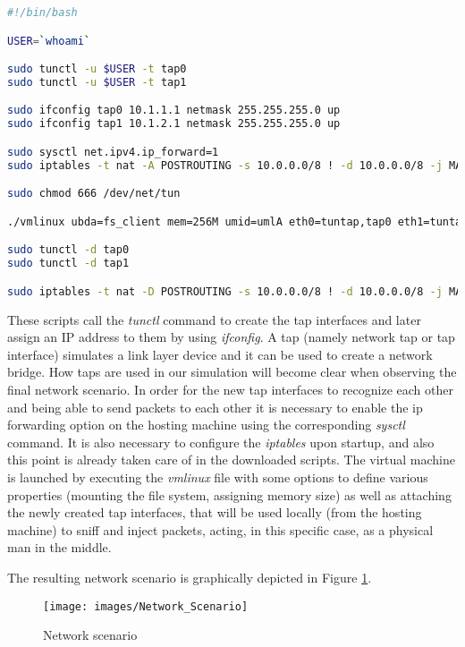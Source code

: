 \begin{lstlisting}[language=bash, caption=\textit{client.sh}, label=clientconf]
#!/bin/bash

USER=`whoami`

sudo tunctl -u $USER -t tap0
sudo tunctl -u $USER -t tap1

sudo ifconfig tap0 10.1.1.1 netmask 255.255.255.0 up
sudo ifconfig tap1 10.1.2.1 netmask 255.255.255.0 up

sudo sysctl net.ipv4.ip_forward=1
sudo iptables -t nat -A POSTROUTING -s 10.0.0.0/8 ! -d 10.0.0.0/8 -j MASQUERADE

sudo chmod 666 /dev/net/tun

./vmlinux ubda=fs_client mem=256M umid=umlA eth0=tuntap,tap0 eth1=tuntap,tap1

sudo tunctl -d tap0
sudo tunctl -d tap1

sudo iptables -t nat -D POSTROUTING -s 10.0.0.0/8 ! -d 10.0.0.0/8 -j MASQUERADE
\end{lstlisting}

These scripts call the \textit{tunctl} command to create the tap interfaces and later assign an IP address to them by using \textit{ifconfig}. A tap (namely network tap or tap interface) simulates a link layer device and it can be used to create a network bridge. How taps are used in our simulation will become clear when observing the final network scenario.
In order for the new tap interfaces to recognize each other and being able to send packets to each other it is necessary to enable the ip forwarding option on the hosting machine using the corresponding \textit{sysctl} command. It is also necessary to configure the \textit{iptables} upon startup, and also this point is already taken care of in the downloaded scripts. The virtual machine is launched by executing the \textit{vmlinux} file with some options to define various properties (mounting the file system, assigning memory size) as well as attaching the newly created tap interfaces, that will be used locally (from the hosting machine) to sniff and inject packets, acting, in this specific case, as a physical man in the middle.

The resulting network scenario is graphically depicted in Figure \ref{fig:networkscenario}.

\begin{figure}[!htb]
\centering
\texttt{[image: images/Network\_Scenario]}
\caption{Network scenario}
\label{fig:networkscenario}
\end{figure}

